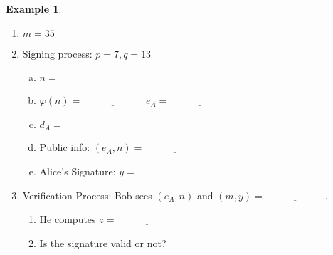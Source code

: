 \documentclass[12pt]{amsart}
\theoremstyle{plain}
\theoremstyle{definition}
\newtheorem*{ex}{Example}
\theoremstyle{remark}
\begin{document}
\begin{ex}
\begin{enumerate}[1.]
	\item[] $m = 35$
	\item Signing process: $p = 7, q = 13$
		\begin{enumerate}[a.]
			\item $n = \underline{\hspace{1in}}$
			\item $\varphi(n) = \underline{\hspace{1in}}$
				$e_A = \underline{\hspace{1in}}$
			\item $d_A = \underline{\hspace{1in}}$
			\item Public info: $(e_A, n)= \underline{\hspace{1in}}$
			\item Alice's Signature: $y = \underline{\hspace{1in}}$
		\end{enumerate}
	\item Verification Process: Bob sees $(e_A, n)$ and $(m,y) = \underline{\hspace{1in}}$.
		\begin{enumerate}
			\item He computes $z = \underline{\hspace{1in}}$
			\item Is the signature valid or not?
		\end{enumerate}
\end{enumerate}
\vspace{1in}
\end{ex}
\end{document}
